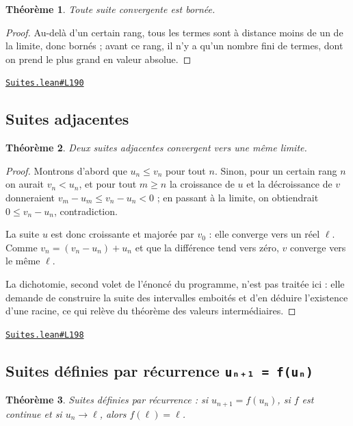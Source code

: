 \documentclass[11pt,a4paper]{article}
\theoremstyle{definition}
\theoremstyle{plain}
\newtheorem{theoreme}{Théorème}
\newcommand{\source}[2]{\par\smallskip\noindent\hfill{\footnotesize\href{#1}{\texttt{#2}}}\par\smallskip}
\begin{document}
\begin{theoreme}
Toute suite convergente est bornée.
\end{theoreme}

\begin{proof}
Au-delà d'un certain rang, tous les termes sont à distance moins de un de la limite,
donc bornés ; avant ce rang, il n'y a qu'un nombre fini de termes, dont on prend le plus
grand en valeur absolue.
\end{proof}
\source{https://github.com/Commutator-IO/learn-lean/blob/main/cours/02-lycee/03-suites/Suites.lean\#L190}{Suites.lean\#L190}

\subsection{Suites adjacentes}

\begin{theoreme}
Deux suites adjacentes convergent vers une même limite.
\end{theoreme}

\begin{proof}
Montrons d'abord que $u_n \le v_n$ pour tout $n$. Sinon, pour un certain rang $n$ on
aurait $v_n < u_n$, et pour tout $m \ge n$ la croissance de $u$ et la décroissance de $v$
donneraient $v_m - u_m \le v_n - u_n < 0$ ; en passant à la limite, on obtiendrait
$0 \le v_n - u_n$, contradiction.

La suite $u$ est donc croissante et majorée par $v_0$ : elle converge vers un réel $\ell$.
Comme $v_n = (v_n - u_n) + u_n$ et que la différence tend vers zéro, $v$ converge vers le
même $\ell$.

La dichotomie, second volet de l'énoncé du programme, n'est pas traitée ici : elle demande
de construire la suite des intervalles emboités et d'en déduire l'existence d'une racine,
ce qui relève du théorème des valeurs intermédiaires.
\end{proof}
\source{https://github.com/Commutator-IO/learn-lean/blob/main/cours/02-lycee/03-suites/Suites.lean\#L198}{Suites.lean\#L198}

\subsection{Suites définies par récurrence \texttt{uₙ₊₁ = f(uₙ)}}

\begin{theoreme}
Suites définies par récurrence : si $u_{n+1} = f(u_n)$, si $f$ est continue et si
$u_n \to \ell$, alors $f(\ell) = \ell$.
\end{theoreme}
\end{document}
